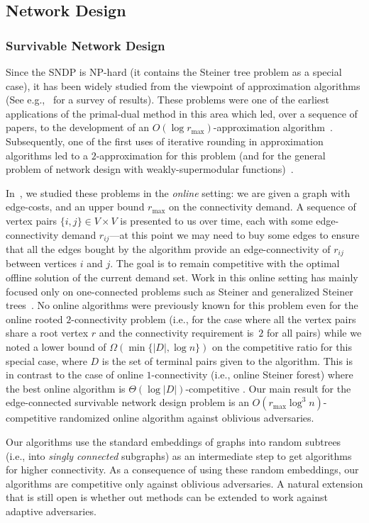 \subsection{Network Design}
\subsubsection{Survivable Network Design}
Since the SNDP is NP-hard (it contains the Steiner tree problem as a special case), it has been widely studied from the viewpoint of approximation algorithms (See e.g.,~\cite{GK11} for a survey of results). These problems were
one of the earliest applications of the primal-dual method in this area
which led, over a sequence of papers, to the development of an $O(\log
r_{\max})$-approximation algorithm~\cite{GGPSTW94}.  Subsequently, one of the first uses of iterative rounding in approximation algorithms
led to a $2$-approximation for this problem (and for the general problem
of network design with weakly-supermodular functions)~\cite{Jain01}.

In~\cite{gkr10}, we studied these problems in the
\emph{online} setting: we are given a graph with edge-costs, and an
upper bound $r_{\max}$ on the connectivity demand. A sequence of vertex pairs $\{i,j\} \in V
\times V$ is presented to us over time, each with some edge-connectivity
demand $r_{ij}$---at this point we may need to buy some edges to ensure
that all the edges bought by the algorithm provide
an edge-connectivity of  $r_{ij}$ between vertices $i$ and $j$.  The goal is to remain
competitive with the optimal offline solution of the current demand set.
Work in this online
setting has mainly focused only on one-connected problems such as
Steiner and generalized Steiner trees~\cite{qw11}.
No online algorithms were previously known
for this problem even for the online rooted $2$-connectivity problem (i.e., for
the case where all the vertex pairs share a root vertex $r$ and the
connectivity requirement is~$2$ for all pairs) while we noted
a lower bound of $\Omega(\min\{|D|, \log n\})$ on the competitive ratio for this special case, where $D$ is the set of terminal pairs given to the
algorithm. This is in contrast to the case of online $1$-connectivity (i.e., online Steiner forest) where the best online algorithm is $\Theta(\log |D|)$-competitive \cite{BCsteiner97}.
Our main result for the edge-connected survivable network design problem is an $O(r_{\max} \log^3 n)$-competitive randomized online algorithm against oblivious adversaries.

Our algorithms use the standard embeddings of graphs into random subtrees (i.e., into \emph{singly    connected} subgraphs) as an intermediate step to get algorithms for higher connectivity. As a consequence of using these random embeddings, our algorithms are competitive only against oblivious adversaries. A natural extension that is still open is whether out methods can be extended to work against adaptive adversaries.

